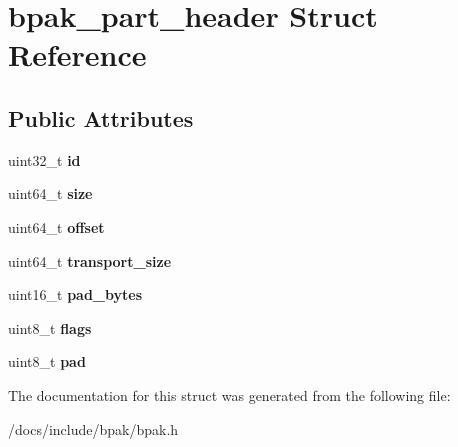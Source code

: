 \hypertarget{structbpak__part__header}{}\section{bpak\+\_\+part\+\_\+header Struct Reference}
\label{structbpak__part__header}
\subsection*{Public Attributes}
\begin{DoxyCompactItemize}
\item 
\mbox{\label{structbpak__part__header_aac876f711a05b5d59a471303e08ad72c}} 
uint32\+\_\+t {\bfseries id}
\item 
\mbox{\label{structbpak__part__header_a8a09a8d9adac920e8d979ff06e1e0c86}} 
uint64\+\_\+t {\bfseries size}
\item 
\mbox{\label{structbpak__part__header_afcef32c53bf2be12d1a272c33230a080}} 
uint64\+\_\+t {\bfseries offset}
\item 
\mbox{\label{structbpak__part__header_a8e2d81c643379ae57f14ccef7dafa0eb}} 
uint64\+\_\+t {\bfseries transport\+\_\+size}
\item 
\mbox{\label{structbpak__part__header_a763865b8bacf84ad5d2be2dd09b9f1cc}} 
uint16\+\_\+t {\bfseries pad\+\_\+bytes}
\item 
\mbox{\label{structbpak__part__header_ad67ad1013fb48a5b5890cf49a2c75a8b}} 
uint8\+\_\+t {\bfseries flags}
\item 
\mbox{\label{structbpak__part__header_ad6636c9af6f0c8a8deb3e56219163806}} 
uint8\+\_\+t {\bfseries pad}
\end{DoxyCompactItemize}


The documentation for this struct was generated from the following file\+:\begin{DoxyCompactItemize}
\item 
/docs/include/bpak/bpak.\+h\end{DoxyCompactItemize}
